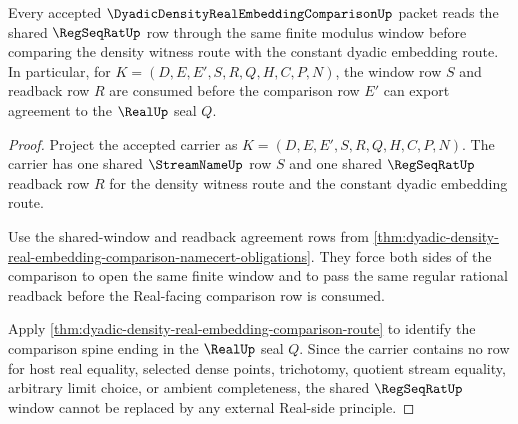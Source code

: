 \begin{theorem}
\label{thm:dyadic-density-real-embedding-comparison-regseqrat-modulus-use}
Every accepted $\DyadicDensityRealEmbeddingComparisonUp$ packet reads the shared $\RegSeqRatUp$ row through the same finite modulus window before comparing the density witness route with the constant dyadic embedding route. In particular, for $K=(D,E,E',S,R,Q,H,C,P,N)$, the window row $S$ and readback row $R$ are consumed before the comparison row $E'$ can export agreement to the $\RealUp$ seal $Q$.
\end{theorem}
\begin{proof}
Project the accepted carrier as $K=(D,E,E',S,R,Q,H,C,P,N)$. The carrier has one shared $\StreamNameUp$ row $S$ and one shared $\RegSeqRatUp$ readback row $R$ for the density witness route and the constant dyadic embedding route.

Use the shared-window and readback agreement rows from \autoref{thm:dyadic-density-real-embedding-comparison-namecert-obligations}. They force both sides of the comparison to open the same finite window and to pass the same regular rational readback before the Real-facing comparison row is consumed.

Apply \autoref{thm:dyadic-density-real-embedding-comparison-route} to identify the comparison spine ending in the $\RealUp$ seal $Q$. Since the carrier contains no row for host real equality, selected dense points, trichotomy, quotient stream equality, arbitrary limit choice, or ambient completeness, the shared $\RegSeqRatUp$ window cannot be replaced by any external Real-side principle.
\end{proof}

